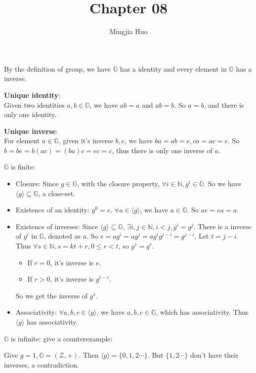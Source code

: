 \documentclass[a4paper]{article}
\newcommand{\G}{\mathbb{G}}
\newcommand{\Z}{\mathcal{Z}}
\newenvironment{problem}[2][Problem]{\begin{trivlist}
\item[\hskip \labelsep {\bfseries #1}\hskip \labelsep {\bfseries #2.}]}{\end{trivlist}}
\begin{document}
 
 
\title{Chapter 08}
\author{Mingjia Huo}
\date{}
\maketitle
\begin{problem}{8.1}
By the definition of group, we have $\G$ has a identity and every element in $\G$ has a inverse.\par
\textbf{Unique identity}:\\
Given two identities $a,b\in\G$, we have $ab=a$ and $ab=b$. So $a=b$, and there is only one identity. \par
\textbf{Unique inverse}:\\
For element $a\in\G$, given it's inverse $b,c$, we have $ba=ab=e, ca=ac=e$. So $b=be=b(ac)=(ba)c=ec=c$, thus there is only one inverse of $a$.
\end{problem}

\begin{problem}{8.3}
$\G$ is finite:
\begin{itemize}
    \item Closure: Since $g\in\G$, with the closure property, $\forall i\in\mathbb{N},g^i\in\G$. So we have $\langle g\rangle\subseteq\G$, a close-set.
    \item Existence of an identity: $g^0=e$. $\forall a\in\langle g\rangle$, we have $a\in\G$. So $ae=ea=a$.
    \item Existence of inverses: Since $\langle g\rangle\subseteq\G$, $\exists i,j\in\mathbb{N},i<j, g^i=g^j$. There is a inverse of $g^i$ in $\G$, denoted as $a$. So $e=ag^i=ag^j=ag^ig^{j-i}=g^{j-i}$. Let $t=j-i$. Thus $\forall s\in\mathbb{N}, s=kt+r,0\le r<t$, so $g^s=g^r$.\begin{itemize}
        \item If $r=0$, it's inverse is $e$.
        \item If $r>0$, it's inverse is $g^{t-r}$.
    \end{itemize} So we get the inverse of $g^s$.
    \item Associativity: $\forall a,b,c\in\langle g\rangle$, we have $a,b,c\in\G$, which has associativity. Thus $\langle g\rangle$ has associativity.
\end{itemize}\par\vspace{1ex}
$\G$ is infinite: give a counterexample:\par
Give $g=1,\G=(\Z,+)$. Then $\langle g\rangle=\{0,1,2\cdots\}$. But $\{1,2\cdots\}$ don't have their inverses, a contradiction.

\end{problem}
\end{document}
